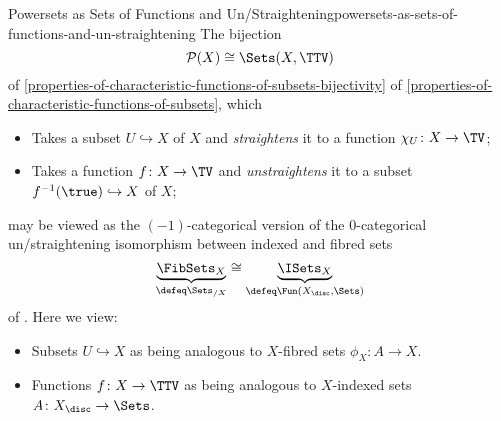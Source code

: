 \begin{remark}{Powersets as Sets of Functions and Un/Straightening}{powersets-as-sets-of-functions-and-un-straightening}%
    The bijection
    \[
        \mathcal{P}(X)%
        \cong%
        \Sets(X,\TTV)%
    \]%
    of \cref{properties-of-characteristic-functions-of-subsets-bijectivity} of \cref{properties-of-characteristic-functions-of-subsets}, which
    \begin{itemize}
        \item Takes a subset $U\hookrightarrow X$ of $X$ and \emph{straightens} it to a function $\chi_{U}\colon X\to\TV$;
        \item Takes a function $f\colon X\to\TV$ and \emph{unstraightens} it to a subset $f^{-1}(\true)\hookrightarrow X$ of $X$;
    \end{itemize}
    may be viewed as the $(-1)$-categorical version of the 0-categorical un/straightening isomorphism between indexed and fibred sets
    \[
        \underbrace{\FibSets_{X}}_{\defeq\Sets_{/X}}%
        \cong%
        \underbrace{\ISets_{X}}_{\defeq\Fun(X_{\disc},\Sets)}%
    \]%
    of . Here we view:
    \begin{itemize}
        \item Subsets $U\hookrightarrow X$ as being analogous to $X$-fibred sets $\phi_{X}\colon A\to X$.
        \item Functions $f\colon X\to\TTV$ as being analogous to $X$-indexed sets $A\colon X_{\disc}\to\Sets$.
    \end{itemize}
\end{remark}
